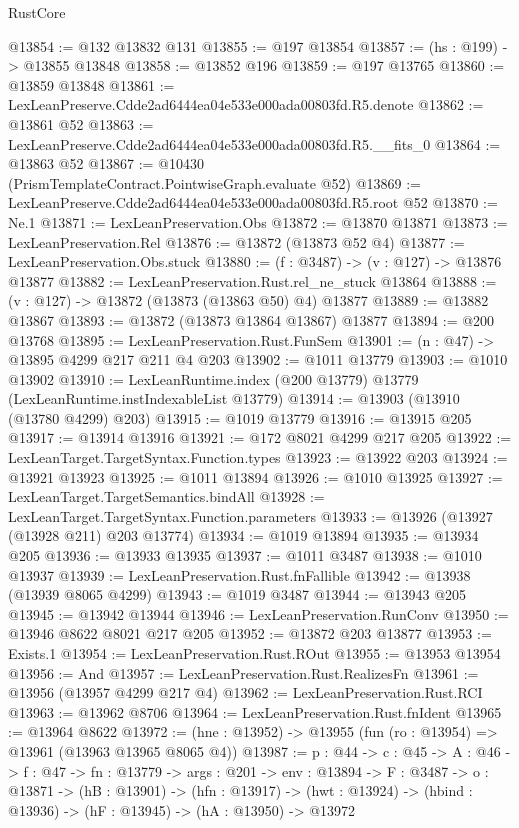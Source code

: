 \begin{lexlean}{RustCore}
\begin{coremodule}
@13854 := @132 @13832 @131
@13855 := @197 @13854
@13857 := (hs : @199) -> @13855 @13848
@13858 := @13852 @196
@13859 := @197 @13765
@13860 := @13859 @13848
@13861 := LexLeanPreserve.Cdde2ad6444ea04e533e000ada00803fd.R5.denote
@13862 := @13861 @52
@13863 := LexLeanPreserve.Cdde2ad6444ea04e533e000ada00803fd.R5.__fits_0
@13864 := @13863 @52
@13867 := @10430 (PrismTemplateContract.PointwiseGraph.evaluate @52)
@13869 := LexLeanPreserve.Cdde2ad6444ea04e533e000ada00803fd.R5.root @52
@13870 := Ne.{1}
@13871 := LexLeanPreservation.Obs
@13872 := @13870 @13871
@13873 := LexLeanPreservation.Rel
@13876 := @13872 (@13873 @52 @4)
@13877 := LexLeanPreservation.Obs.stuck
@13880 := (f : @3487) -> (v : @127) -> @13876 @13877
@13882 := LexLeanPreservation.Rust.rel_ne_stuck @13864
@13888 := (v : @127) -> @13872 (@13873 (@13863 @50) @4) @13877
@13889 := @13882 @13867
@13893 := @13872 (@13873 @13864 @13867) @13877
@13894 := @200 @13768
@13895 := LexLeanPreservation.Rust.FunSem
@13901 := (n : @47) -> @13895 @4299 @217 @211 @4 @203
@13902 := @1011 @13779
@13903 := @1010 @13902
@13910 := LexLeanRuntime.index (@200 @13779) @13779 (LexLeanRuntime.instIndexableList @13779)
@13914 := @13903 (@13910 (@13780 @4299) @203)
@13915 := @1019 @13779
@13916 := @13915 @205
@13917 := @13914 @13916
@13921 := @172 @8021 @4299 @217 @205
@13922 := LexLeanTarget.TargetSyntax.Function.types
@13923 := @13922 @203
@13924 := @13921 @13923
@13925 := @1011 @13894
@13926 := @1010 @13925
@13927 := LexLeanTarget.TargetSemantics.bindAll
@13928 := LexLeanTarget.TargetSyntax.Function.parameters
@13933 := @13926 (@13927 (@13928 @211) @203 @13774)
@13934 := @1019 @13894
@13935 := @13934 @205
@13936 := @13933 @13935
@13937 := @1011 @3487
@13938 := @1010 @13937
@13939 := LexLeanPreservation.Rust.fnFallible
@13942 := @13938 (@13939 @8065 @4299)
@13943 := @1019 @3487
@13944 := @13943 @205
@13945 := @13942 @13944
@13946 := LexLeanPreservation.RunConv
@13950 := @13946 @8622 @8021 @217 @205
@13952 := @13872 @203 @13877
@13953 := Exists.{1}
@13954 := LexLeanPreservation.Rust.ROut
@13955 := @13953 @13954
@13956 := And
@13957 := LexLeanPreservation.Rust.RealizesFn
@13961 := @13956 (@13957 @4299 @217 @4)
@13962 := LexLeanPreservation.Rust.RCI
@13963 := @13962 @8706
@13964 := LexLeanPreservation.Rust.fnIdent
@13965 := @13964 @8622
@13972 := (hne : @13952) -> @13955 (fun (ro : @13954) => @13961 (@13963 @13965 @8065 @4))
@13987 := {p : @44} ->
  {c : @45} ->
  {A : @46} ->
  {f : @47} ->
  {fn : @13779} ->
  {args : @201} ->
  {env : @13894} ->
  {F : @3487} ->
  {o : @13871} ->
  (hB : @13901) ->
  (hfn : @13917) -> (hwt : @13924) -> (hbind : @13936) -> (hF : @13945) -> (hA : @13950) -> @13972

\end{coremodule}
\end{lexlean}

